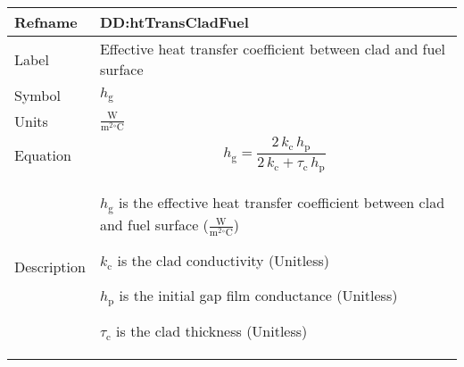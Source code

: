 \documentclass[12pt]{article}
\begin{document}
\medskip
\noindent
\begin{minipage}{\textwidth}
\begin{tabular}{>{\raggedright}p{}>{\raggedright\arraybackslash}p{}}
\toprule \textbf{Refname} & \textbf{DD:htTransCladFuel}
\label{DD:htTransCladFuel}
\\ \midrule
Label & Effective heat transfer coefficient between clad and fuel surface
        
\\ \midrule
Symbol & ${h_{\text{g}}}$
         
\\ \midrule
Units & $\frac{\text{W}}{\text{m}^{2}{}^{\circ}\text{C}}$
        
\\ \midrule
Equation & \begin{displaymath}
           {h_{\text{g}}}=\frac{2\,{k_{\text{c}}}\,{h_{\text{p}}}}{2\,{k_{\text{c}}}+{τ_{\text{c}}}\,{h_{\text{p}}}}
           \end{displaymath}
\\ \midrule
Description & \begin{symbDescription}
              \item{${h_{\text{g}}}$ is the effective heat transfer coefficient between clad and fuel surface ($\frac{\text{W}}{\text{m}^{2}{}^{\circ}\text{C}}$)}
              \item{${k_{\text{c}}}$ is the clad conductivity (Unitless)}
              \item{${h_{\text{p}}}$ is the initial gap film conductance (Unitless)}
              \item{${τ_{\text{c}}}$ is the clad thickness (Unitless)}
              \end{symbDescription}
\\ \bottomrule
\end{tabular}
\end{minipage}
\end{document}
